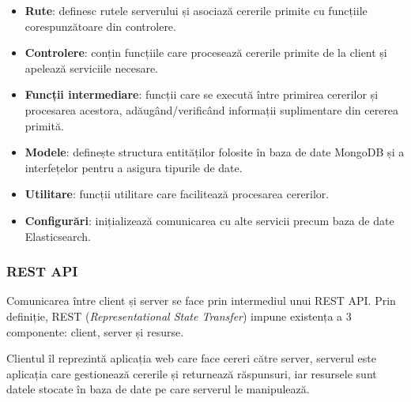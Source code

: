 \begin{itemize}
    \item \textbf{Rute}: definesc rutele serverului și asociază cererile primite cu funcțiile
    corespunzătoare din controlere.
    \item \textbf{Controlere}: conțin funcțiile care procesează cererile primite de la client
    și apelează serviciile necesare.
    \item \textbf{Funcții intermediare}: funcții care se execută între primirea cererilor și procesarea
    acestora, adăugând/verificând informații suplimentare din cererea primită.
    \item \textbf{Modele}: definește structura entităților folosite în baza de date MongoDB 
    și a interfețelor pentru a asigura tipurile de date.
    \item \textbf{Utilitare}: funcții utilitare care facilitează procesarea cererilor.
    \item \textbf{Configurări}: inițializează comunicarea cu alte servicii precum baza de date Elasticsearch.
\end{itemize}

\subsubsection{REST API}
Comunicarea între client și server se face prin intermediul unui REST API. Prin definiție,
REST (\textit{Representational State Transfer}) impune existența a 3 componente: client, server și resurse.
\par
Clientul îl reprezintă aplicația web care face cereri către server, serverul este aplicația
care  gestionează cererile și returnează răspunsuri, iar resursele sunt datele stocate
în baza de date pe care serverul le manipulează.

